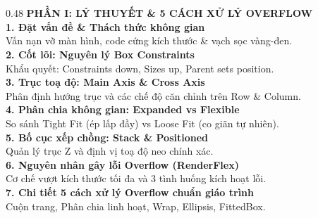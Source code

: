 \documentclass[aspectratio=169, 10pt]{beamer}
\newcommand{\SlideHeader}[2]{%
  \noindent{\textcolor{AccentOrange}{\textbf{\footnotesize #1}}}\\[0.08cm]
  \noindent{\Large \textbf{\textcolor{NavyTitle}{#2}}}\\[0.22cm]
}
\begin{document}
\begin{frame}
  \SlideHeader{TỔNG QUAN CHUYÊN ĐỀ}{Nội Dung Báo Cáo (15 Phút)}

  \begin{columns}[T]
    \begin{column}{0.48\textwidth}
      {\textcolor{AccentOrange}{\textbf{PHẦN I: LÝ THUYẾT \& 5 CÁCH XỬ LÝ OVERFLOW}}}\\[0.18cm]

      \textbf{1. Đặt vấn đề \& Thách thức không gian}\\
      {\footnotesize Vấn nạn vỡ màn hình, code cứng kích thước \& vạch sọc vàng-đen.}\\[0.14cm]

      \textbf{2. Cốt lõi: Nguyên lý Box Constraints}\\
      {\footnotesize Khẩu quyết: Constraints down, Sizes up, Parent sets position.}\\[0.14cm]

      \textbf{3. Trục toạ độ: Main Axis \& Cross Axis}\\
      {\footnotesize Phân định hướng trục và các chế độ căn chỉnh trên Row \& Column.}\\[0.14cm]

      \textbf{4. Phân chia không gian: Expanded vs Flexible}\\
      {\footnotesize So sánh Tight Fit (ép lấp đầy) vs Loose Fit (co giãn tự nhiên).}\\[0.14cm]

      \textbf{5. Bố cục xếp chồng: Stack \& Positioned}\\
      {\footnotesize Quản lý trục Z và định vị toạ độ neo chính xác.}\\[0.14cm]

      \textbf{6. Nguyên nhân gây lỗi Overflow (RenderFlex)}\\
      {\footnotesize Cơ chế vượt kích thước tối đa và 3 tình huống kích hoạt lỗi.}\\[0.14cm]

      \textbf{7. Chi tiết 5 cách xử lý Overflow chuẩn giáo trình}\\
      {\footnotesize Cuộn trang, Phân chia linh hoạt, Wrap, Ellipsis, FittedBox.}
    \end{column}


\end{columns}
\end{frame}
\end{document}
